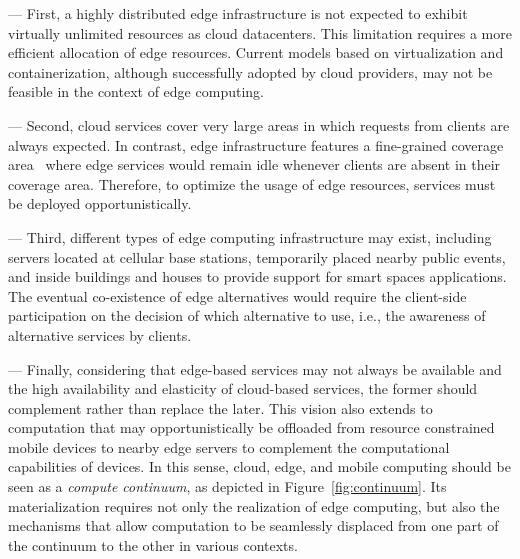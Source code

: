 
--- First, a highly distributed edge infrastructure is not expected to exhibit virtually unlimited resources as cloud datacenters. This limitation requires a more efficient allocation of edge resources. Current models based on virtualization and containerization, although successfully adopted by cloud providers, may not be feasible in the context of edge computing.


--- Second, cloud services cover very large areas in which requests from clients are always expected. In contrast, edge infrastructure features a fine-grained coverage area~\cite{Dehos14millimeter5g} where edge services would remain idle whenever clients are absent in their coverage area. Therefore, to optimize the usage of edge resources, services must be deployed opportunistically.



--- Third, different types of edge computing infrastructure may exist, including servers located at cellular base stations, temporarily placed nearby public events, and inside buildings and houses to provide support for smart spaces applications. The eventual co-existence of edge alternatives would require the client-side participation on the decision of which alternative to use, i.e., the awareness of alternative services by clients.




--- Finally, considering that edge-based services may not always be available and the high availability and elasticity of cloud-based services, the former should complement rather than replace the later. This vision also extends to computation that may opportunistically be offloaded from resource constrained mobile devices to nearby edge servers to complement the computational capabilities of devices. In this sense, cloud, edge, and mobile computing should be seen as a \textit{compute continuum}, as depicted in Figure~\ref{fig:continuum}. Its materialization requires not only the realization of edge computing, but also the mechanisms that allow computation to be seamlessly displaced from one part of the continuum to the other in various contexts. 

